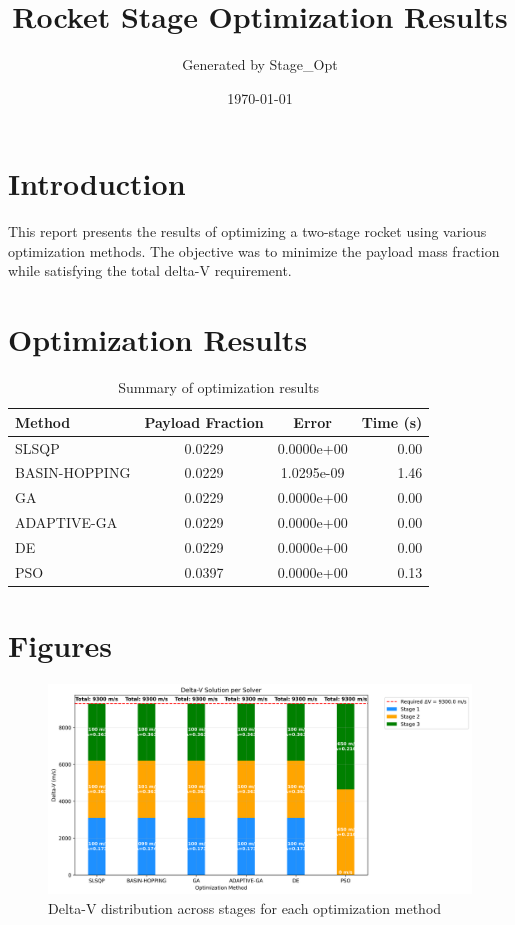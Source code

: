 \documentclass{article}
\title{Rocket Stage Optimization Results}
\author{Generated by Stage\_Opt}
\date{\today}
\begin{document}
\maketitle

\section{Introduction}
This report presents the results of optimizing a two-stage rocket using various optimization methods. The objective was to minimize the payload mass fraction while satisfying the total delta-V requirement.

\section{Optimization Results}
\begin{table}[H]
\centering
\begin{tabular}{lccr}
\toprule
Method & Payload Fraction & Error & Time (s) \\
\midrule
SLSQP & 0.0229 & 0.0000e+00 & 0.00 \\
BASIN-HOPPING & 0.0229 & 1.0295e-09 & 1.46 \\
GA & 0.0229 & 0.0000e+00 & 0.00 \\
ADAPTIVE-GA & 0.0229 & 0.0000e+00 & 0.00 \\
DE & 0.0229 & 0.0000e+00 & 0.00 \\
PSO & 0.0397 & 0.0000e+00 & 0.13 \\
\bottomrule
\end{tabular}
\caption{Summary of optimization results}
\label{tab:results}
\end{table}

\section{Figures}
\begin{figure}[H]
\centering
\includegraphics[width=\textwidth]{dv_breakdown.png}
\caption{Delta-V distribution across stages for each optimization method}
\label{fig:dv-breakdown}
\end{figure}
\end{document}
